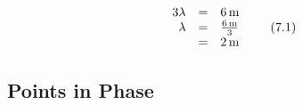 {\begin{mdframed}[linewidth=4, leftmargin=40, rightmargin=40]
\begin{exercise}
\begin{enumerate}[noitemsep, label=\textbf{Step} \textbf{\arabic*}. ]
    \begin{equation}
    \begin{array}{ccc}\hfill 3\lambda & =& 6\phantom{\rule{0.166667em}{0ex}}\mathrm{m}\hfill \\ \hfill \lambda & =& \frac{6\phantom{\rule{0.166667em}{0ex}}\mathrm{m}}{3}\hfill \\ & =& 2\phantom{\rule{0.166667em}{0ex}}\mathrm{m}\hfill \end{array}\tag{7.1}
      \end{equation}
        \end{enumerate}
    \end{exercise}
    \end{mdframed}
    }
    \noindent
      \label{m38806*uid19}
            \subsection{ Points in Phase}
            \nopagebreak
\label{m38806*secfhsst!!!underscore!!!id359}
